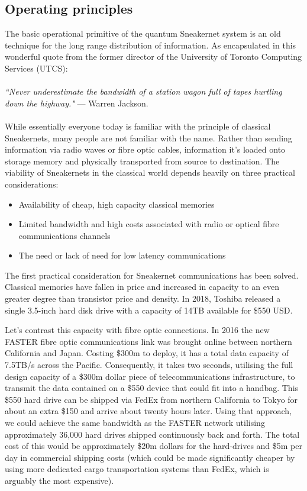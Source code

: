 \documentclass[twocolumn, aps, rmp, amsmath, amssymb, nofootinbib, superscriptaddress, longbibliography, floatfix, table-of-contents, eqsecnum]{revtex4-2}
\newcommand{\famousquote}[2]{\noindent\textit{``#1"} --- #2.\index{Quotes}\index{#2}}
\begin{document}
\subsection{Operating principles}

The basic operational primitive of the quantum Sneakernet system is an old technique for the long range distribution of information. As encapsulated in this wonderful quote from the former director of the University of Toronto Computing Services (UTCS):
\\
\\
\famousquote{Never underestimate the bandwidth of a station wagon full of tapes hurtling down the highway.}{Warren Jackson}
\\
\\
While essentially everyone today is familiar with the principle of classical Sneakernets, many people are not familiar with the name. Rather than sending information via radio waves or fibre optic cables, information it's loaded onto storage memory and physically transported from source to destination. The viability of Sneakernets in the classical world depends heavily on three practical considerations:
\begin{itemize}
\item Availability of cheap, high capacity classical memories
\item Limited bandwidth and high costs associated with radio or optical fibre communications channels
\item The need or lack of need for low latency communications 
\end{itemize}

The first practical consideration for Sneakernet communications has been solved. Classical memories have fallen in price and increased in capacity to an even greater degree than transistor price and density. In 2018, Toshiba released a single 3.5-inch hard disk drive with a capacity of 14TB available for \$550 USD. 

Let's contrast this capacity with fibre optic connections. In 2016 the new FASTER fibre optic communications link was brought online between northern California and Japan. Costing \$300m to deploy, it has a total data capacity of 7.5TB/s across the Pacific. Consequently, it takes two seconds, utilising the full design capacity of a \$300m dollar piece of telecommunications infrastructure, to transmit the data contained on a \$550 device that could fit into a handbag. This \$550 hard drive can be shipped via FedEx from northern California to Tokyo for about an extra \$150 and arrive about twenty hours later. Using that approach, we could achieve the same bandwidth as the FASTER network utilising approximately 36,000 hard drives shipped continuously back and forth. The total cost of this would be approximately \$20m dollars for the hard-drives and \$5m per day in commercial shipping costs (which could be made significantly cheaper by using more dedicated cargo transportation systems than FedEx, which is arguably the most expensive).
\end{document}
